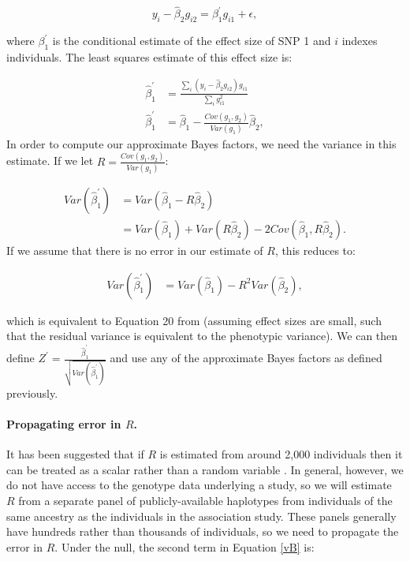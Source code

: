 \documentclass[11pt,titlepage]{article}
\begin{document}
\begin{equation}
y_i - \hat \beta_2 g_{i2} =  \beta_1^{\prime} g_{i1} + \epsilon,
\end{equation}

\noindent where  $\beta_1^{\prime}$ is the conditional estimate of the effect size of SNP 1 and $i$ indexes individuals. The least squares estimate of this effect size is:

\begin{align}
\hat \beta_1^{\prime} &= \frac{\sum \limits_i (y_i - \hat \beta_2 g_{i2})  g_{i1}}{ \sum \limits_i g_{i1}^2} \\
\hat \beta_1^{\prime} &= \hat \beta_1 - \frac{Cov(g_1, g_2)}{Var(g_1)} \hat \beta_2,
\end{align}
\noindent In order to compute our approximate Bayes factors, we need the variance in this estimate. If we let $R = \frac{Cov(g_1, g_2)}{Var(g_1)}$:

\begin{align}
Var(\hat \beta_1^{\prime}) &= Var( \hat \beta_1 - R \hat \beta_2)\\
&= Var(\hat \beta_1) + Var(R \hat \beta_2) - 2 Cov (\hat \beta_1, R \hat \beta_2) \label{vB}.
\end{align}
If we assume that there is no error in our estimate of $R$, this reduces to:

\begin{align}
Var(\hat \beta_1^{\prime}) &= Var(\hat \beta_1) - R^2 Var( \hat \beta_2),
\end{align}

\noindent which is equivalent to Equation 20 from \citet{Yang:2012uq} (assuming effect sizes are small, such that the residual variance is equivalent to the phenotypic variance). We can then define $Z^{\prime} = \frac{\hat \beta_1^{\prime}}{\sqrt{ Var(\hat \beta_1^{\prime})}}$ and use any of the approximate Bayes factors as defined previously. 

\paragraph{Propagating error in $R$.} It has been suggested that if $R$ is estimated from around 2,000 individuals then it can be treated as a scalar rather than a random variable \citep{Yang:2012uq}. In general, however, we do not have access to the genotype data underlying a study, so we will estimate $R$ from a separate panel of publicly-available haplotypes from individuals of the same ancestry as the individuals in the association study. These panels generally have hundreds rather than thousands of individuals, so we need to propagate the error in $R$. Under the null, the second term in Equation \ref{vB} is:
\end{document}
